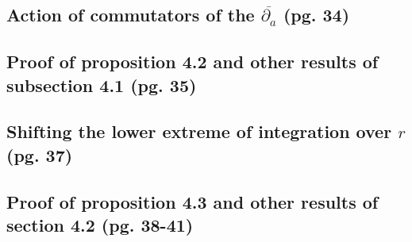 \documentclass{article}
\begin{document}
\subsection{Action of commutators of the $\overline{\partial_a}$ (pg. 34)}

\subsection{Proof of proposition 4.2 and other results of subsection 4.1 (pg. 35)}

\subsection{Shifting the lower extreme of integration over $r$ (pg. 37)}

\subsection{Proof of proposition 4.3 and other results of section 4.2 (pg. 38-41)}
\end{document}
